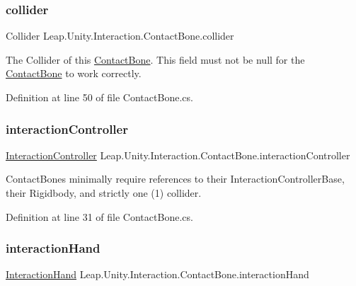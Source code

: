 \subsubsection{\texorpdfstring{collider}{collider}}
{\footnotesize\ttfamily Collider Leap.\+Unity.\+Interaction.\+Contact\+Bone.\+collider}



The Collider of this \mbox{\hyperlink{class_leap_1_1_unity_1_1_interaction_1_1_contact_bone}{Contact\+Bone}}. This field must not be null for the \mbox{\hyperlink{class_leap_1_1_unity_1_1_interaction_1_1_contact_bone}{Contact\+Bone}} to work correctly. 



Definition at line 50 of file Contact\+Bone.\+cs.

\mbox{\label{class_leap_1_1_unity_1_1_interaction_1_1_contact_bone_aa2aca8ef28781d61cf239aa51049c667}} 
\subsubsection{\texorpdfstring{interactionController}{interactionController}}
{\footnotesize\ttfamily \mbox{\hyperlink{class_leap_1_1_unity_1_1_interaction_1_1_interaction_controller}{Interaction\+Controller}} Leap.\+Unity.\+Interaction.\+Contact\+Bone.\+interaction\+Controller}



Contact\+Bones minimally require references to their Interaction\+Controller\+Base, their Rigidbody, and strictly one (1) collider. 



Definition at line 31 of file Contact\+Bone.\+cs.

\mbox{\label{class_leap_1_1_unity_1_1_interaction_1_1_contact_bone_a87f0ed05ef3a68fa7b4b2a616d396692}} 
\subsubsection{\texorpdfstring{interactionHand}{interactionHand}}
{\footnotesize\ttfamily \mbox{\hyperlink{class_leap_1_1_unity_1_1_interaction_1_1_interaction_hand}{Interaction\+Hand}} Leap.\+Unity.\+Interaction.\+Contact\+Bone.\+interaction\+Hand}



